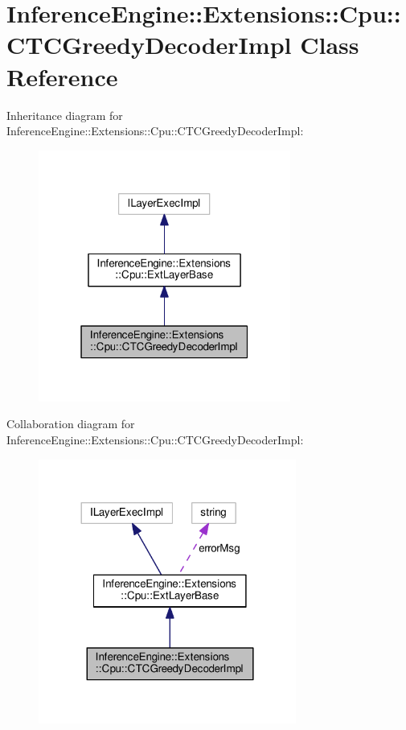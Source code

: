 \hypertarget{classInferenceEngine_1_1Extensions_1_1Cpu_1_1CTCGreedyDecoderImpl}{}\section{Inference\+Engine\+:\+:Extensions\+:\+:Cpu\+:\+:C\+T\+C\+Greedy\+Decoder\+Impl Class Reference}
\label{classInferenceEngine_1_1Extensions_1_1Cpu_1_1CTCGreedyDecoderImpl}


Inheritance diagram for Inference\+Engine\+:\+:Extensions\+:\+:Cpu\+:\+:C\+T\+C\+Greedy\+Decoder\+Impl\+:
\nopagebreak
\begin{figure}[H]
\begin{center}
\leavevmode
\includegraphics[width=235pt]{classInferenceEngine_1_1Extensions_1_1Cpu_1_1CTCGreedyDecoderImpl__inherit__graph}
\end{center}
\end{figure}


Collaboration diagram for Inference\+Engine\+:\+:Extensions\+:\+:Cpu\+:\+:C\+T\+C\+Greedy\+Decoder\+Impl\+:
\nopagebreak
\begin{figure}[H]
\begin{center}
\leavevmode
\includegraphics[width=240pt]{classInferenceEngine_1_1Extensions_1_1Cpu_1_1CTCGreedyDecoderImpl__coll__graph}
\end{center}
\end{figure}
